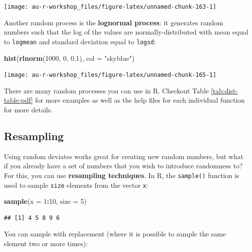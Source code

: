 \documentclass[]{book}
\newenvironment{Shaded}{\begin{snugshade}}{\end{snugshade}}
\newcommand{\KeywordTok}[1]{\textcolor[rgb]{0.13,0.29,0.53}{\textbf{#1}}}
\newcommand{\DataTypeTok}[1]{\textcolor[rgb]{0.13,0.29,0.53}{#1}}
\newcommand{\DecValTok}[1]{\textcolor[rgb]{0.00,0.00,0.81}{#1}}
\newcommand{\FloatTok}[1]{\textcolor[rgb]{0.00,0.00,0.81}{#1}}
\newcommand{\StringTok}[1]{\textcolor[rgb]{0.31,0.60,0.02}{#1}}
\newcommand{\OperatorTok}[1]{\textcolor[rgb]{0.81,0.36,0.00}{\textbf{#1}}}
\newcommand{\NormalTok}[1]{#1}
\theoremstyle{definition}
\theoremstyle{definition}
\theoremstyle{definition}
\theoremstyle{remark}
\begin{document}
\begin{center}\texttt{[image: au-r-workshop\_files/figure-latex/unnamed-chunk-163-1]} \end{center}

Another random process is the \textbf{lognormal process}: it generates
random numbers such that the log of the values are normally-distributed
with mean equal to \texttt{logmean} and standard deviation equal to
\texttt{logsd}:

\begin{Shaded}
\begin{Highlighting}[]
\KeywordTok{hist}\NormalTok{(}\KeywordTok{rlnorm}\NormalTok{(}\DecValTok{1000}\NormalTok{, }\DecValTok{0}\NormalTok{, }\FloatTok{0.1}\NormalTok{), }\DataTypeTok{col =} \StringTok{"skyblue"}\NormalTok{)}
\end{Highlighting}
\end{Shaded}

\begin{center}\texttt{[image: au-r-workshop\_files/figure-latex/unnamed-chunk-165-1]} \end{center}

There are many random processes you can use in R. Checkout Table
\ref{tab:dist-table-pdf} for more examples as well as the help files for
each individual function for more details.

\subsection{Resampling}\label{resampling}

Using random deviates works great for creating new random numbers, but
what if you already have a set of numbers that you wish to introduce
randomness to? For this, you can use \textbf{resampling techniques}. In
R, the \texttt{sample()} function is used to sample \texttt{size}
elements from the vector \texttt{x}:

\begin{Shaded}
\begin{Highlighting}[]
\KeywordTok{sample}\NormalTok{(}\DataTypeTok{x =} \DecValTok{1}\OperatorTok{:}\DecValTok{10}\NormalTok{, }\DataTypeTok{size =} \DecValTok{5}\NormalTok{)}
\end{Highlighting}
\end{Shaded}

\begin{verbatim}
## [1] 4 5 8 9 6
\end{verbatim}

You can sample with replacement (where it is possible to sample the same
element two or more times):
\end{document}

